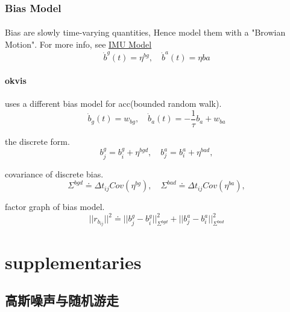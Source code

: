 \documentclass[10pt,a4paper]{article}
\begin{document}
\subsubsection{Bias Model}
\paragraph{}Bias are slowly time-varying quantities, Hence model them with a "Browian Motion".
For more info, see \href{http://www.cnblogs.com/youzx/p/6291327.html?utm_source=itdadao&utm_medium=referral}{IMU Model}
\begin{equation}
\dot{b}^g(t) = \eta^{bg}, \quad \dot{b}^a(t) = \eta{ba}
\end{equation}

\paragraph{okvis} uses a different bias model for acc(bounded random walk).
\begin{equation}
\dot{b}_g(t) = w_{bg}, \quad \dot{b}_a(t) = -\frac{1}{\tau} b_a + w_{ba}
\end{equation}


the discrete form.
\begin{equation}
b^g_j= b^g_i + \eta^{bgd}, \quad b^a_j= b^a_i + \eta^{bad},
\end{equation}

covariance of discrete bias.
\begin{equation}
\Sigma^{bgd} \doteq \Delta t_{ij} Cov(\eta^{bg}), \quad \Sigma^{bad} \doteq \Delta t_{ij} Cov(\eta^{ba}),
\end{equation}

factor graph of bias model.
\begin{equation}
||r_{b_{ij}} ||^2 \doteq ||b_j^g - b_i^g||_{\Sigma^{bgd}}^2 + ||b_j^a - b_i^a||_{\Sigma^{bad}}^2
\end{equation}



\section{supplementaries}
\subsection{高斯噪声与随机游走}
\end{document}
